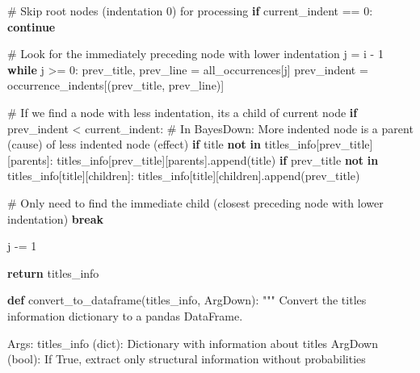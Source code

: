\documentclass[
  11pt,
  letterpaper,
]{book}
\newenvironment{Shaded}{\begin{snugshade}}{\end{snugshade}}
\newcommand{\CommentTok}[1]{\textcolor[rgb]{0.37,0.37,0.37}{#1}}
\newcommand{\ControlFlowTok}[1]{\textcolor[rgb]{0.00,0.23,0.31}{\textbf{#1}}}
\newcommand{\DecValTok}[1]{\textcolor[rgb]{0.68,0.00,0.00}{#1}}
\newcommand{\KeywordTok}[1]{\textcolor[rgb]{0.00,0.23,0.31}{\textbf{#1}}}
\newcommand{\NormalTok}[1]{\textcolor[rgb]{0.00,0.23,0.31}{#1}}
\newcommand{\OperatorTok}[1]{\textcolor[rgb]{0.37,0.37,0.37}{#1}}
\newcommand{\StringTok}[1]{\textcolor[rgb]{0.13,0.47,0.30}{#1}}
\begin{document}
\begin{Shaded}
\begin{Highlighting}[]
        \CommentTok{\# Skip root nodes (indentation 0) for processing}
        \ControlFlowTok{if}\NormalTok{ current\_indent }\OperatorTok{==} \DecValTok{0}\NormalTok{:}
            \ControlFlowTok{continue}

        \CommentTok{\# Look for the immediately preceding node with lower indentation}
\NormalTok{        j }\OperatorTok{=}\NormalTok{ i }\OperatorTok{{-}} \DecValTok{1}
        \ControlFlowTok{while}\NormalTok{ j }\OperatorTok{\textgreater{}=} \DecValTok{0}\NormalTok{:}
\NormalTok{            prev\_title, prev\_line }\OperatorTok{=}\NormalTok{ all\_occurrences[j]}
\NormalTok{            prev\_indent }\OperatorTok{=}\NormalTok{ occurrence\_indents[(prev\_title, prev\_line)]}

            \CommentTok{\# If we find a node with less indentation, it\textquotesingle{}s a child of current node}
            \ControlFlowTok{if}\NormalTok{ prev\_indent }\OperatorTok{\textless{}}\NormalTok{ current\_indent:}
                \CommentTok{\# In BayesDown: More indented node is a parent (cause) of less indented node (effect)}
                \ControlFlowTok{if}\NormalTok{ title }\KeywordTok{not} \KeywordTok{in}\NormalTok{ titles\_info[prev\_title][}\StringTok{\textquotesingle{}parents\textquotesingle{}}\NormalTok{]:}
\NormalTok{                    titles\_info[prev\_title][}\StringTok{\textquotesingle{}parents\textquotesingle{}}\NormalTok{].append(title)}
                \ControlFlowTok{if}\NormalTok{ prev\_title }\KeywordTok{not} \KeywordTok{in}\NormalTok{ titles\_info[title][}\StringTok{\textquotesingle{}children\textquotesingle{}}\NormalTok{]:}
\NormalTok{                    titles\_info[title][}\StringTok{\textquotesingle{}children\textquotesingle{}}\NormalTok{].append(prev\_title)}

                \CommentTok{\# Only need to find the immediate child (closest preceding node with lower indentation)}
                \ControlFlowTok{break}

\NormalTok{            j }\OperatorTok{{-}=} \DecValTok{1}

    \ControlFlowTok{return}\NormalTok{ titles\_info}

\KeywordTok{def}\NormalTok{ convert\_to\_dataframe(titles\_info, ArgDown):}
    \CommentTok{"""}
\CommentTok{    Convert the titles information dictionary to a pandas DataFrame.}

\CommentTok{    Args:}
\CommentTok{        titles\_info (dict): Dictionary with information about titles}
\CommentTok{        ArgDown (bool): If True, extract only structural information without probabilities}


\end{Highlighting}
\end{Shaded}
\end{document}
